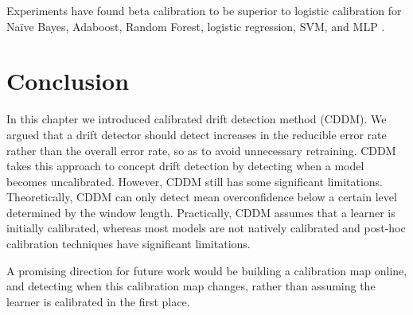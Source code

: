 Experiments have found beta calibration to be superior to logistic calibration for Na\"{i}ve Bayes, Adaboost, Random Forest, logistic regression, SVM, and MLP \cite{beyond_sigmoids}. 


\section{Conclusion} \label{CDDM:conclusion}

In this chapter we introduced calibrated drift detection method (CDDM). We argued that a drift detector should detect increases in the reducible error rate rather than the overall error rate, so as to avoid unnecessary retraining. CDDM takes this approach to concept drift detection by detecting when a model becomes uncalibrated. However, CDDM still has some significant limitations. Theoretically, CDDM can only detect mean overconfidence below a certain level determined by the window length. Practically, CDDM assumes that a learner is initially calibrated, whereas most models are not natively calibrated and post-hoc calibration techniques have significant limitations.

A promising direction for future work would be building a calibration map online, and detecting when this calibration map changes, rather than assuming the learner is calibrated in the first place.